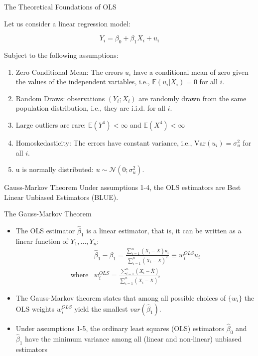 \documentclass[notes,10pt, aspectratio=169]{beamer}
\begin{document}
\begin{frame}{The Theoretical Foundations of OLS}

Let us consider a linear regression model:

\[
Y_i = \beta_0 + \beta_1 X_{i}  + u_i
\]

Subject to the following assumptions:

\begin{enumerate}
    \item Zero Conditional Mean: The errors $u_i$ have a conditional mean of zero given the values of the independent variables, i.e., $\mathbb{E}(u_i|X_{i}) = 0$ for all $i$.

    \item Random Draws: observations $(Y_i;X_i)$ are randomly drawn from the same population distribution, i.e., they are i.i.d. for all $i$.
    
    \item Large outliers are rare: $\mathbb{E}(Y^4)<\infty$ and $\mathbb{E}(X^4)<\infty$
    
    \item Homoskedasticity: The errors have constant variance, i.e., $\text{Var}(u_i) = \sigma_u^2$ for all $i$.
    
    \item u is normally distributed: $u\sim\mathcal{N}(0;\sigma_u^2)$.
\end{enumerate}

\begin{exampleblock}{Gauss-Markov Theorem}
Under assumptions 1-4, the OLS estimators are Best Linear Unbiased Estimators (BLUE).
\end{exampleblock}
\end{frame}

\begin{frame}{The Gauss-Markov Theorem}
\begin{itemize}
    \item The OLS estimator $\hat{\beta}_1$ is a linear estimator, that is, it can be written as a linear function of $Y_1, ..., Y_n$:
    \begin{eqnarray*}
        &\hat{\beta}_1-\beta_1 = \frac{\sum_{i=1}^n (X_i - \overline{X})u_i}{\sum_{i=1}^n(X_i - \overline{X})^2}\equiv w^{OLS}_iu_i\\
        \text{where} &w^{OLS}_i=\frac{\sum_{i=1}^n (X_i - \overline{X})}{\sum_{i=1}^n(X_i - \overline{X})^2}
    \end{eqnarray*}
    \item The Gauss-Markov theorem states that among all possible choices of $\{w_i\}$ the OLS weights $w^{OLS}_i$ yield the smallest $var(\hat{\beta}_1)$.
    \item Under assumptions 1-5, the ordinary least squares (OLS) estimators $\hat{\beta}_0$ and $\hat{\beta}_1$  have the minimum variance among all (linear and non-linear) unbiased estimators
\end{itemize}
\end{frame}
\end{document}
